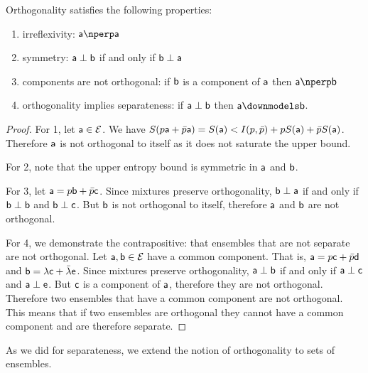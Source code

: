 \begin{mathSection}
\begin{prop}\label{pm_es_orthoProps}
	Orthogonality satisfies the following properties:
	\begin{enumerate}
		\item irreflexivity: $\ens[a] \northo \ens[a]$
		\item symmetry: $\ens[a] \ortho \ens[b]$ if and only if $\ens[b] \ortho \ens[a]$
		\item components are not orthogonal: if $\ens[b]$ is a component of $\ens[a]$ then $\ens[a] \northo \ens[b]$
		\item orthogonality implies separateness: if $\ens[a] \ortho \ens[b]$ then $\ens[a] \separate \ens[b]$.
	\end{enumerate}
\end{prop}

\begin{proof}
	For 1, let $\ens[a] \in \Ens$. We have $S(p\ens[a] + \bar{p}\ens[a]) = S(\ens[a]) < I(p,\bar{p}) + p S(\ens[a]) + \bar{p} S(\ens[a])$. Therefore $\ens[a]$ is not orthogonal to itself as it does not saturate the upper bound.
	
	For 2, note that the upper entropy bound is symmetric in $\ens[a]$ and $\ens[b]$.
	
	For 3, let $\ens[a] = p \ens[b] + \bar{p} \ens[c]$. Since mixtures preserve orthogonality, $\ens[b] \ortho \ens[a]$ if and only if $\ens[b] \ortho \ens[b]$ and $\ens[b] \ortho \ens[c]$. But $\ens[b]$ is not orthogonal to itself, therefore $\ens[a]$ and $\ens[b]$ are not orthogonal.
	
	For 4, we demonstrate the contrapositive: that ensembles that are not separate are not orthogonal. Let $\ens[a], \ens[b] \in \Ens$ have a common component. That is, $\ens[a] = p \ens[c] + \bar{p} \ens[d]$ and $\ens[b] = \lambda \ens[c] + \bar{\lambda} \ens[e]$. Since mixtures preserve orthogonality, $\ens[a] \ortho \ens[b]$ if and only if $\ens[a] \ortho \ens[c]$ and $\ens[a] \ortho \ens[e]$. But $\ens[c]$ is a component of $\ens[a]$, therefore they are not orthogonal. Therefore two ensembles that have a common component are not orthogonal. This means that if two ensembles are orthogonal they cannot have a common component and are therefore separate.
\end{proof}
\end{mathSection}

As we did for separateness, we extend the notion of orthogonality to sets of ensembles.

